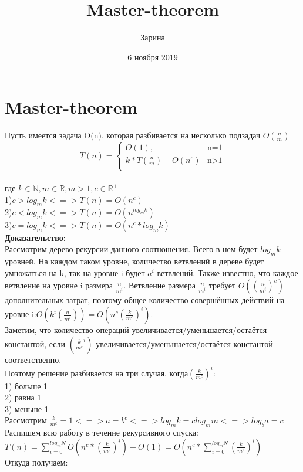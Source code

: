 \documentclass[a4paper,12pt]{article}
\author{Зарина}
\title{Master-theorem}
\date{6 ноября 2019}
\begin{document}
\section{Master-theorem}
Пусть имеется задача  O(n), которая разбивается на несколько подзадач $O(\frac{n}{m})$
\begin{displaymath}
T(n) = \left\{ \begin{array}{ll}
 O(1), & \textrm{n=1}\\
 k*T(\frac{n}{m})+O(n^c) & \textrm{n>1}\\
  \end{array} \right.
\end{displaymath}\\
где $k\in\mathbb{N},m\in\mathbb{R}, m>1,c\in\mathbb{R}^+ $\\
1)$c>log_mk <=>T(n)=O(n^c)$\\
2)$c<log_mk <=>T(n) = O(n^{log_mk})$\\
3)$c=log_mk <=>T(n) = O(n^c*log_mk)$\\

\textbf{Доказательство:}\\Рассмотрим дерево рекурсии данного соотношения. Всего в нем будет $log_mk$ уровней. На каждом таком уровне, количество ветвлений в дереве будет умножаться на k, так на уровне i будет $a^i$ ветвлений. Также известно, что каждое ветвление на уровне i размера $\frac{n}{m^i}$.  Ветвление размера $\frac{n}{m^i}$ требует $O((\frac{n}{m^i})^c)$ дополнительных затрат, поэтому общее количество совершённых действий на уровне i:$O(k^i(\frac{n}{m^i}))=O(n^c(\frac{k}{m^c})^i)$. 
\\Заметим, что количество операций увеличивается/уменьшается/остаётся константой, если $(\frac{k}{m^c}^i)$ увеличивается/уменьшается/остаётся константой соответственно.\\
Поэтому решение разбивается на три случая, когда$(\frac{k}{m^c})^i$:\\
1) больше 1\\
2) равна 1\\
3) меньше 1\\
Рассмотрим $\frac{k}{m^c} = 1 <=> a = b^c <=> log_mk = clog_mm <=> log_ba = c$\\
Распишем всю работу в течение рекурсивного спуска:\\
$T(n) = \sum_{i=0}^{log_mN}O(n^c*(\frac{k}{m^c})^i)+O(1)=O(n^c*\sum_{i=0}^{log_mN}(\frac{k}{m^c})^i)$\\
Откуда получаем:\\
\end{document}
